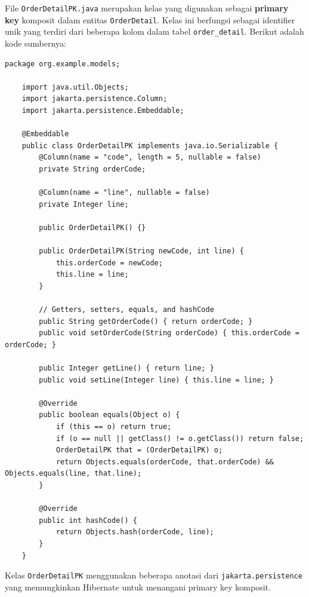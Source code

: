 File \texttt{OrderDetailPK.java} merupakan kelas yang digunakan sebagai \textbf{primary key} komposit dalam entitas \texttt{OrderDetail}. Kelas ini berfungsi sebagai identifier unik yang terdiri dari beberapa kolom dalam tabel \texttt{order\_detail}. Berikut adalah kode sumbernya:

\begin{lstlisting}[style=JavaStyle]
	package org.example.models;
	
	import java.util.Objects;
	import jakarta.persistence.Column;
	import jakarta.persistence.Embeddable;
	
	@Embeddable
	public class OrderDetailPK implements java.io.Serializable {
		@Column(name = "code", length = 5, nullable = false)
		private String orderCode;
		
		@Column(name = "line", nullable = false)
		private Integer line;
		
		public OrderDetailPK() {}
		
		public OrderDetailPK(String newCode, int line) {
			this.orderCode = newCode;
			this.line = line;
		}
		
		// Getters, setters, equals, and hashCode
		public String getOrderCode() { return orderCode; }
		public void setOrderCode(String orderCode) { this.orderCode = orderCode; }
		
		public Integer getLine() { return line; }
		public void setLine(Integer line) { this.line = line; }
		
		@Override
		public boolean equals(Object o) {
			if (this == o) return true;
			if (o == null || getClass() != o.getClass()) return false;
			OrderDetailPK that = (OrderDetailPK) o;
			return Objects.equals(orderCode, that.orderCode) && Objects.equals(line, that.line);
		}
		
		@Override
		public int hashCode() {
			return Objects.hash(orderCode, line);
		}
	}
\end{lstlisting}

Kelas \texttt{OrderDetailPK} menggunakan beberapa anotasi dari \texttt{jakarta.persistence} yang memungkinkan Hibernate untuk menangani primary key komposit.

